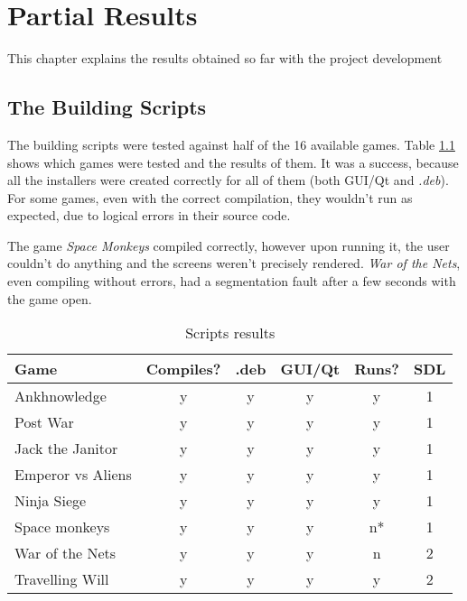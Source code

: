 \chapter[Partial Results]{Partial Results}
\label{sec:results}

This chapter explains the results obtained so far with the project development



\section{The Building Scripts}
\label{sec:building_scripts}

The building scripts were tested against half of the 16 available games. Table \ref{tab:script_games} shows which games were tested and the results of them. It was a success, because all the installers were created correctly for all of them (both GUI/Qt and \textit{.deb}). For some games, even with the correct compilation, they wouldn't run as expected, due to logical errors in their source code.

The game \textit{Space Monkeys} compiled correctly, however upon running it, the user couldn't do anything and the screens weren't precisely rendered. \textit{War of the Nets}, even compiling without errors, had a segmentation fault after a few seconds with the game open.

\begin{table}[h!]
\centering
\caption{Scripts results}
\label{tab:script_games}
\begin{tabular}{lccccc}
\toprule
\textbf{Game} & \multicolumn{1}{l}{\textbf{Compiles?}} & \multicolumn{1}{l}{\textbf{.deb}} & \multicolumn{1}{l}{\textbf{GUI/Qt}} & \multicolumn{1}{l}{\textbf{Runs?}} & \multicolumn{1}{l}{\textbf{SDL}} \\
\midrule
Ankhnowledge & y & y & y & y & 1 \\
Post War & y & y & y & y & 1 \\
Jack the Janitor & y & y & y & y & 1 \\
Emperor vs Aliens & y & y & y & y & 1 \\
Ninja Siege & y & y & y & y & 1 \\
Space monkeys & y & y & y & n* & 1 \\
War of the Nets & y & y & y & n & 2 \\
Travelling Will & y & y & y & y & 2 \\
\bottomrule
\end{tabular}
\end{table}

